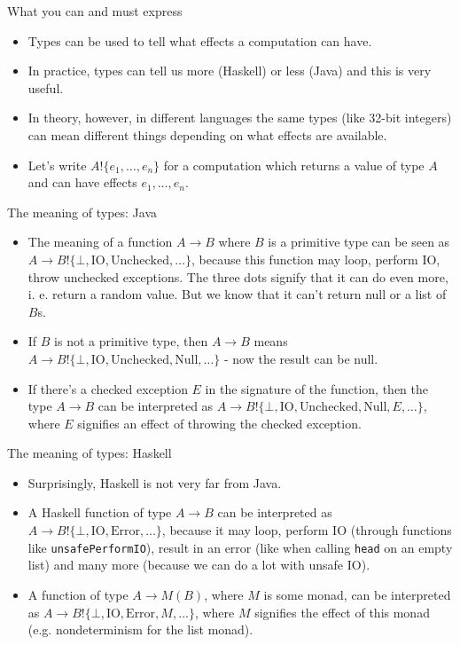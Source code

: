 \documentclass{beamer}
\newcommand{\eff}[2]{#1 ! \{ #2 \}}
\begin{document}
\begin{frame}{What you can and must express}
\begin{itemize}
	\item Types can be used to tell what effects a computation can have.
	\item In practice, types can tell us more (Haskell) or less (Java) and this is very useful.
	\item In theory, however, in different languages the same types (like 32-bit integers) can mean different things depending on what effects are available.
	\item Let's write $\eff{A}{e_1, \dots, e_n}$ for a computation which returns a value of type $A$ and can have effects $e_1, \dots, e_n$.
\end{itemize}
\end{frame}

\begin{frame}{The meaning of types: Java}
\begin{itemize}
	\item The meaning of a function $A \to B$ where $B$ is a primitive type can be seen as $A \to \eff{B}{\bot, \text{IO}, \text{Unchecked}, \dots}$, because this function may loop, perform IO, throw unchecked exceptions. The three dots signify that it can do even more, i. e. return a random value. But we know that it can't return null or a list of $B$s.
	\item If $B$ is not a primitive type, then $A \to B$ means $A \to \eff{B}{\bot, \text{IO}, \text{Unchecked}, \text{Null}, \dots}$ - now the result can be null.
	\item If there's a checked exception $E$ in the signature of the function, then the type $A \to B$ can be interpreted as $A \to \eff{B}{\bot, \text{IO}, \text{Unchecked}, \text{Null}, E, \dots}$, where $E$ signifies an effect of throwing the checked exception.
\end{itemize}
\end{frame}

\begin{frame}{The meaning of types: Haskell}
\begin{itemize}
	\item Surprisingly, Haskell is not very far from Java.
	\item A Haskell function of type $A \to B$ can be interpreted as $A \to \eff{B}{\bot, \text{IO}, \text{Error}, \dots}$, because it may loop, perform IO (through functions like \texttt{unsafePerformIO}), result in an error (like when calling \texttt{head} on an empty list) and many more (because we can do a lot with unsafe IO).
	\item A function of type $A \to M(B)$, where $M$ is some monad, can be interpreted as $A \to \eff{B}{\bot, \text{IO}, \text{Error}, M, \dots}$, where $M$ signifies the effect of this monad (e.g. nondeterminism for the list monad).
\end{itemize}
\end{frame}
\end{document}

